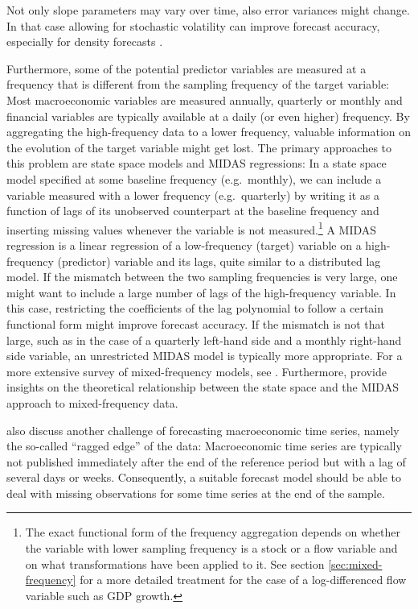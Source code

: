 Not only slope parameters may vary over time, also error variances might change. In that case allowing for stochastic volatility can improve forecast accuracy, especially for density forecasts \citep{Clark2011}.

Furthermore, some of the potential predictor variables are measured at a frequency that is different from the sampling frequency of the target variable: Most macroeconomic variables are measured annually, quarterly or monthly and financial variables are typically available at a daily (or even higher) frequency. By aggregating the high-frequency data to a lower frequency, valuable information on the evolution of the target variable might get lost. The primary approaches to this problem are state space models and MIDAS regressions: In a state space model specified at some baseline frequency (e.g.~monthly), we can include a variable measured with a lower frequency (e.g.~quarterly) by writing it as a function of lags of its unobserved counterpart at the baseline frequency and inserting missing values whenever the variable is not measured.\footnote{
	The exact functional form of the frequency aggregation depends on whether the variable with lower sampling frequency is a stock or a flow variable and on what transformations have been applied to it. See section \ref{sec:mixed-frequency} for a more detailed treatment for the case of a log-differenced flow variable such as GDP growth.
} A MIDAS regression is a linear regression of a low-frequency (target) variable on a high-frequency (predictor) variable and its lags, quite similar to a distributed lag model. If the mismatch between the two sampling frequencies is very large, one might want to include a large number of lags of the high-frequency variable. In this case, restricting the coefficients of the lag polynomial to follow a certain functional form might improve forecast accuracy. If the mismatch is not that large, such as in the case of a quarterly left-hand side and a monthly right-hand side variable, an unrestricted MIDAS model is typically more appropriate. For a more extensive survey of mixed-frequency models, see \citet{ForoniMarcellino2013}. Furthermore, \citet{BaiEtal2013} provide insights on the theoretical relationship between the state space and the MIDAS approach to mixed-frequency data.
	
\citeauthor{ForoniMarcellino2013} also discuss another challenge of forecasting macroeconomic time series, namely the so-called ``ragged edge'' of the data: Macroeconomic time series are typically not published immediately after the end of the reference period but with a lag of several days or weeks. Consequently, a suitable forecast model should be able to deal with missing observations for some time series at the end of the sample.

